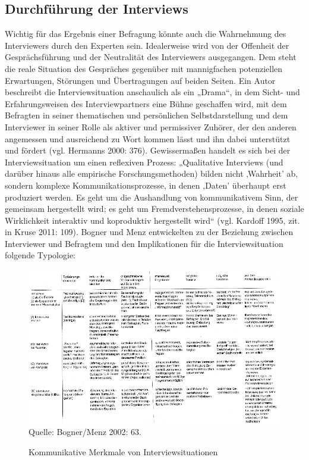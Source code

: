 \subsection{Durchführung der Interviews} 
Wichtig für das Ergebnis einer Befragung könnte auch die Wahrnehmung des Interviewers durch den Experten sein. Idealerweise wird von der Offenheit der Gesprächsführung und der Neutralität des Interviewers ausgegangen. Dem steht die reale Situation des Gespräches gegenüber mit mannigfachen potenziellen Erwartungen, Störungen und Übertragungen auf beiden Seiten. Ein Autor beschreibt die Interviewsituation anschaulich als ein „Drama“, in dem Sicht- und Erfahrungsweisen des Interviewpartners eine Bühne geschaffen wird, mit dem Befragten in seiner thematischen und persönlichen Selbstdarstellung und dem Interviewer in seiner Rolle als aktiver und permissiver Zuhörer, der den anderen angemessen und ausreichend zu Wort kommen lässt und ihn dabei unterstützt und fördert (vgl. Hermanns 2000: 376). Gewissermaßen handelt es sich bei der Interviewsituation um einen reflexiven Prozess: „Qualitative Interviews (und darüber hinaus alle empirische Forschungsmethoden) bilden nicht ‚Wahrheit’ ab, sondern komplexe Kommunikationsprozesse, in denen ‚Daten’ überhaupt erst produziert werden. Es geht um die Aushandlung von kommunikativem Sinn, der gemeinsam hergestellt wird; es geht um Fremdverstehensprozesse, in denen soziale Wirklichkeit interaktiv und koproduktiv hergestellt wird“ (vgl. Kardoff 1995, zit. in Kruse 2011: 109). Bogner und Menz entwickelten zu der Beziehung zwischen Interviewer und Befragtem und den Implikationen für die Interviewsituation folgende Typologie:
\begin{figure}
\caption{Kommunikative Merkmale von Interviewsituationen}
\includegraphics[width=5in]{Material/BognerMenz}\\
\scriptsize{Quelle: Bogner/Menz 2002: 63.}
\end{figure}
